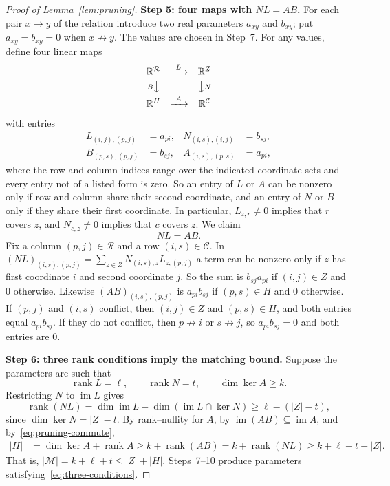 \documentclass[11pt]{article}
\theoremstyle{remark}
\newcommand{\abs}[1]{\lvert #1\rvert}
\DeclareMathOperator{\rank}{rank}
\DeclareMathOperator{\im}{im}
\newcommand{\R}{\mathbb R}
\newcommand{\step}[1]{\par\medskip\noindent\textbf{#1}\enspace}
\begin{document}
\begin{proof}[Proof of Lemma~\ref{lem:pruning}]
\step{Step 5: four maps with $NL=AB$.}
For each pair $x\to y$ of the relation introduce two real parameters
$a_{xy}$ and $b_{xy}$; put $a_{xy}=b_{xy}=0$ when $x\not\to y$.  The values
are chosen in Step~7.  For any values, define four linear maps
\[
 \begin{array}{ccc}
 \R^{\mathcal R}&\xrightarrow{\ L\ }&\R^Z\\[3pt]
 {\scriptstyle B}\big\downarrow&&\big\downarrow{\scriptstyle N}\\[3pt]
 \R^H&\xrightarrow{\ A\ }&\R^{\mathcal C}
 \end{array}
\]
with entries
\begin{equation}\label{eq:pruning-maps}
 \begin{aligned}
 L_{(i,j),(p,j)}&=a_{pi},&
 N_{(i,s),(i,j)}&=b_{sj},\\
 B_{(p,s),(p,j)}&=b_{sj},&
 A_{(i,s),(p,s)}&=a_{pi},
 \end{aligned}
\end{equation}
where the row and column indices range over the indicated coordinate sets
and every entry not of a listed form is zero.  So an entry of $L$ or $A$ can
be nonzero only if row and column share their second coordinate, and an
entry of $N$ or $B$ only if they share their first coordinate.
In particular, $L_{z,r}\neq0$ implies that $r$ covers $z$, and
$N_{c,z}\neq0$ implies that $c$ covers $z$.  We claim
\begin{equation}\label{eq:pruning-commute}
 NL=AB.
\end{equation}
Fix a column $(p,j)\in\mathcal R$ and a row $(i,s)\in\mathcal C$.
In $(NL)_{(i,s),(p,j)}=\sum_{z\in Z}N_{(i,s),z}L_{z,(p,j)}$ a term can be
nonzero only if $z$ has first coordinate $i$ and second coordinate $j$.
So the sum is $b_{sj}a_{pi}$ if $(i,j)\in Z$ and $0$ otherwise.
Likewise $(AB)_{(i,s),(p,j)}$ is $a_{pi}b_{sj}$ if $(p,s)\in H$ and $0$
otherwise.  If $(p,j)$ and $(i,s)$ conflict, then $(i,j)\in Z$ and
$(p,s)\in H$, and both entries equal $a_{pi}b_{sj}$.  If they do not
conflict, then $p\not\to i$ or $s\not\to j$, so $a_{pi}b_{sj}=0$ and both
entries are $0$.

\step{Step 6: three rank conditions imply the matching bound.}
Suppose the parameters are such that
\begin{equation}\label{eq:three-conditions}
 \rank L=\ell,\qquad \rank N=t,\qquad \dim\ker A\geq k.
\end{equation}
Restricting $N$ to $\im L$ gives
\[
 \rank(NL)
 =\dim\im L-\dim(\im L\cap\ker N)
 \geq\ell-(\abs Z-t),
\]
since $\dim\ker N=\abs Z-t$.  By rank--nullity for $A$,
by $\im(AB)\subseteq\im A$, and by~\eqref{eq:pruning-commute},
\begin{align}
 \abs H
 &=\dim\ker A+\rank A
 \geq k+\rank(AB)= k+\rank(NL)
 \geq k+\ell+t-\abs Z.
 \label{eq:pruning-rank-bound}
\end{align}
That is, $\abs{\mathcal M}=k+\ell+t\le\abs Z+\abs H$.  Steps~7--10 produce
parameters satisfying~\eqref{eq:three-conditions}.


\end{proof}
\end{document}
